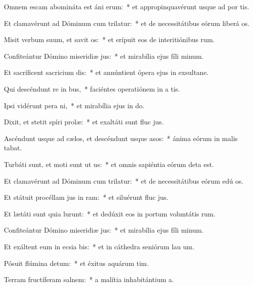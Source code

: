 \item Omnem escam abomináta est áni erum:~* et appropinquavérunt usque ad por tis.
\item Et clamavérunt ad Dóminum cum trilatur:~* et de necessitátibus eórum liberá os.
\item Misit verbum suum, et savit os:~* et erípuit eos de interitiónibus rum.
\item Confiteántur Dómino miseridiæ jus:~* et mirabília ejus fíli minum.
\item Et sacríficent sacricium dis:~* et annúntient ópera ejus in exsultane.
\item Qui descéndunt re in bus,~* faciéntes operatiónem in a tis.
\item Ipsi vidérunt pera ni,~* et mirabília ejus in do.
\item Dixit, et stetit spíri prolæ:~* et exaltáti sunt fluc jus.
\item Ascéndunt usque ad cælos, et descéndunt usque  asos:~* ánima eórum in malis tabat.
\item Turbáti sunt, et moti sunt ut us:~* et omnis sapiéntia eórum deta est.
\item Et clamavérunt ad Dóminum cum trilatur:~* et de necessitátibus eórum edú os.
\item Et státuit procéllam jus in ram:~* et siluérunt fluc jus.
\item Et lætáti sunt quia lurunt:~* et dedúxit eos in portum voluntátis rum.
\item Confiteántur Dómino miseridiæ jus:~* et mirabília ejus fíli minum.
\item Et exáltent eum in ecsia bis:~* et in cáthedra seniórum lau um.
\item Pósuit flúmina  detum:~* et éxitus aquárum  tim.
\item Terram fructíferam  salnem:~* a malítia inhabitántium  a.
